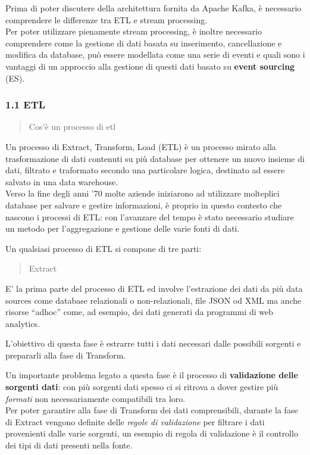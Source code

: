 \documentclass[]{article}
\begin{document}
Prima di poter discutere della architettura fornita da Apache Kafka, è
necessario comprendere le differenze tra ETL e stream processing.\\
Per poter utilizzare pienamente stream processing, è inoltre necessario
comprendere come la gestione di dati basata su inserimento,
cancellazione e modifica da database, può essere modellata come una
serie di eventi e quali sono i vantaggi di un approccio alla gestione di
questi dati basato su \textbf{event sourcing} (ES).

\subsubsection{1.1 ETL}\label{etl}

\begin{quote}
Cos'è un processo di etl
\end{quote}

Un processo di Extract, Transform, Load (ETL) è un processo mirato alla
trasformazione di dati contenuti su più database per ottenere un nuovo
insieme di dati, filtrato e traformato secondo una particolare logica,
destinato ad essere salvato in una data warehouse.\\
Verso la fine degli anni '70 molte aziende iniziarono ad utilizzare
molteplici database per salvare e gestire informazioni, è proprio in
questo contesto che nascono i processi di ETL: con l'avanzare del tempo
è stato necessario studiare un metodo per l'aggregazione e gestione
delle varie fonti di dati.

Un qualsiasi processo di ETL si compone di tre parti:

\begin{quote}
Extract
\end{quote}

E' la prima parte del processo di ETL ed involve l'estrazione dei dati
da più data sources come database relazionali o non-relazionali, file
JSON od XML ma anche risorse ``adhoc'' come, ad esempio, dei dati
generati da programmi di web analytics.

L'obiettivo di questa fase è estrarre tutti i dati necessari dalle
possibili sorgenti e prepararli alla fase di Transform.

Un importante problema legato a questa fase è il processo di
\textbf{validazione delle sorgenti dati}: con più sorgenti dati spesso
ci si ritrova a dover gestire più \emph{formati} non necessariamente
compatibili tra loro.\\
Per poter garantire alla fase di Transform dei dati comprensibili,
durante la fase di Extract vengono definite delle \emph{regole di
validazione} per filtrare i dati provenienti dalle varie sorgenti, un
esempio di regola di validazione è il controllo dei tipi di dati
presenti nella fonte.
\end{document}
